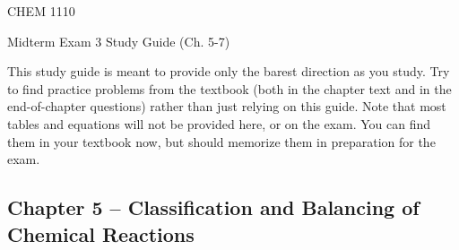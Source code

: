 \documentclass[12pt, letterpaper]{memoir}
\begin{document}
	\mainmatter
	
	\begin{center}
		{\Huge CHEM 1110}
		
		{\LARGE Midterm Exam 3 Study Guide (Ch. 5-7)}
	\end{center}
	
		This study guide is meant to provide only the barest direction as you study. Try to find practice problems from the textbook (both in the chapter text and in the end-of-chapter questions) rather than just relying on this guide. Note that most tables and equations will not be provided here, or on the exam. You can find them in your textbook now, but should memorize them in preparation for the exam.

	\subsection*{Chapter 5 --  Classification and Balancing of Chemical Reactions}
\end{document}
